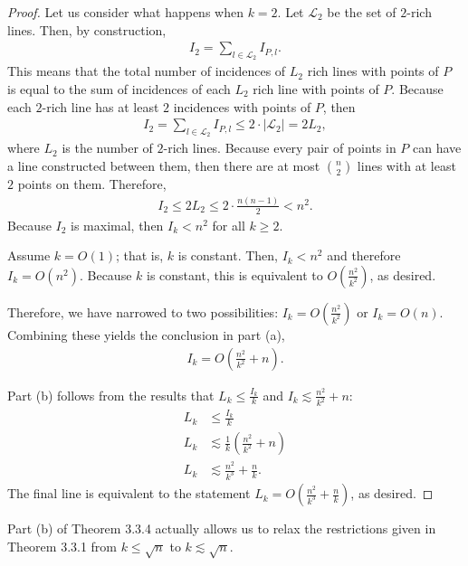 \documentclass{scrippsthesisclass}
\theoremstyle{definition}
\begin{document}
\begin{proof}
Let us consider what happens when $k = 2$. 
Let $\mathcal{L}_2$ be the set of $2$-rich lines. 
Then, by construction,
\begin{align}
    I_2 = \sum_{l \in \mathcal{L}_2} I_{P, l}.
\end{align}
This means that the total number of incidences of $L_2$ rich lines with points of $P$ is equal to the sum of incidences of each $L_2$ rich line with points of $P$.
Because each $2$-rich line has at least $2$ incidences with points of $P$, then 
\begin{align}
    I_2  = \sum_{l \in \mathcal{L}_2} I_{P, l} \leq 2 \cdot |\mathcal{L}_2| = 2L_2,
\end{align}
where $L_2$ is the number of $2$-rich lines. 
Because every pair of points in $P$ can have a line constructed between them, then there are at most ${n \choose 2}$ lines with at least $2$ points on them. 
Therefore, 
\begin{align}
    I_2 \leq 2L_2 \leq 2 \cdot \frac{n(n-1)}{2} < n^2.
\end{align}
Because $I_2$ is maximal, then $I_k < n^2$ for all $k \geq 2$.

Assume $k = O(1)$; that is, $k$ is constant. 
Then, $I_k < n^2$ and therefore $I_k = O\left(n^2\right)$. Because $k$ is constant, this is equivalent to $O\left(\frac{n^2}{k^2}\right)$, as desired. 

Therefore, we have narrowed to two possibilities: $I_k = O\left(\frac{n^2}{k^2} \right)$ or $I_k = O(n)$. 
Combining these yields the conclusion in part (a), 
\begin{align}
    I_k = O\left(\frac{n^2}{k^2} + n \right).
\end{align}

Part (b) follows from the results that $L_k \leq \frac{I_k}{k}$ and $I_k \lesssim \frac{n^2}{k^2} + n$:
\begin{align}
    L_k &\leq \frac{I_k}{k}\\
    L_k & \lesssim \frac{1}{k} \left(\frac{n^2}{k^2} + n \right)\\
    L_k & \lesssim \frac{n^2}{k^3} + \frac{n}{k}.
\end{align}
The final line is equivalent to the statement $L_k = O\left(\frac{n^2}{k^3} + \frac{n}{k} \right)$, as desired. 
 
\end{proof}

Part (b) of Theorem 3.3.4 actually allows us to relax the restrictions given in Theorem 3.3.1 from $k \leq \sqrt{n}$ to $k \lesssim \sqrt{n}$. 
\end{document}

